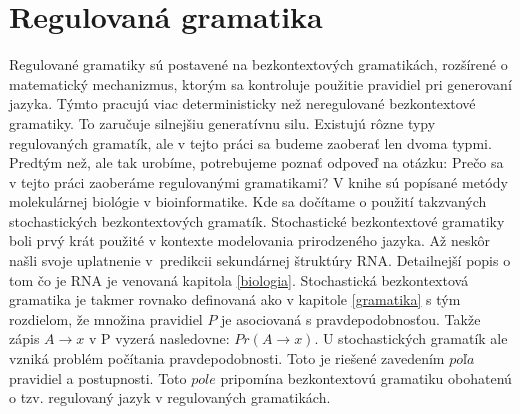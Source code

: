 \section{Regulovaná gramatika}
Regulované gramatiky sú postavené na bezkontextových gramatikách, rozšírené o matematický mechanizmus, ktorým sa kontroluje použitie pravidiel pri generovaní jazyka. Týmto pracujú viac deterministicky než neregulované bezkontextové gramatiky. To zaručuje silnejšiu generatívnu silu. Existujú rôzne typy regulovaných gramatík, ale v tejto práci sa budeme zaoberať len dvoma typmi. Predtým než, ale tak urobíme, potrebujeme poznať odpoveď na otázku: Prečo sa v tejto práci zaoberáme regulovanými gramatikami? V knihe \cite{Methodes} sú popísané metódy molekulárnej biológie v bioinformatike. Kde sa dočítame o použití takzvaných stochastických bezkontextových gramatík. Stochastické bezkontextové gramatiky boli prvý krát použité v kontexte modelovania prirodzeného jazyka. Až neskôr našli svoje uplatnenie v~predikcii sekundárnej štruktúry RNA. Detailnejší popis o tom čo je RNA je venovaná kapitola \ref{biologia}. Stochastická bezkontextová gramatika je takmer rovnako definovaná ako v kapitole \ref{gramatika} s tým rozdielom, že množina pravidiel $P$ je asociovaná s pravdepodobnosťou. Takže zápis $A \to x$ v P vyzerá nasledovne: $Pr(A \to x)$. U stochastických gramatík ale vzniká problém počítania pravdepodobnosti. Toto je riešené zavedením $poľa$ pravidiel a postupnosti. Toto $pole$ pripomína bezkontextovú gramatiku obohatenú o tzv. regulovaný jazyk v regulovaných gramatikách.

